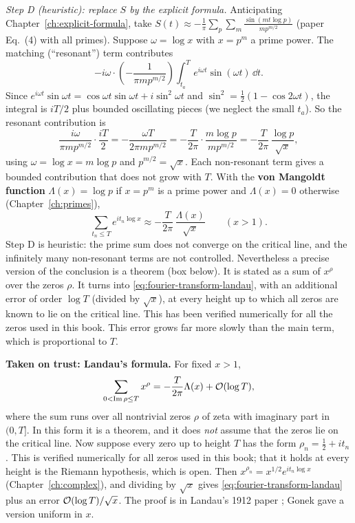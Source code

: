 \emph{Step D (heuristic): replace $S$ by the explicit formula.} Anticipating Chapter~\ref{ch:explicit-formula}, take $S(t)\approx-\frac1\pi\sum_{p}\sum_{m}\frac{\sin(mt\log p)}{mp^{m/2}}$ (paper Eq.~(4) with all primes). Suppose $\omega=\log x$ with $x=p^m$ a prime power. The matching (``resonant'') term contributes
\[-i\omega\cdot\left(-\frac{1}{\pi mp^{m/2}}\right)\int_{t_a}^{T}e^{i\omega t}\sin(\omega t)\,\dd t .\]
Since $e^{i\omega t}\sin\omega t=\cos\omega t\sin\omega t+i\sin^2\omega t$ and $\sin^2=\frac12(1-\cos2\omega t)$, the integral is $iT/2$ plus bounded oscillating pieces (we neglect the small $t_a$). So the resonant contribution is
\[\frac{i\omega}{\pi mp^{m/2}}\cdot\frac{iT}{2}=-\frac{\omega T}{2\pi mp^{m/2}}=-\frac{T}{2\pi}\cdot\frac{m\log p}{mp^{m/2}}=-\frac{T}{2\pi}\,\frac{\log p}{\sqrt x},\]
using $\omega=\log x=m\log p$ and $p^{m/2}=\sqrt x$. Each non-resonant term gives a bounded contribution that does not grow with $T$. With the \textbf{von Mangoldt function} $\Lambda(x)=\log p$ if $x=p^m$ is a prime power and $\Lambda(x)=0$ otherwise (Chapter~\ref{ch:primes}),
\begin{equation}
\sum_{t_n\le T}e^{i t_n\log x}\approx-\frac{T}{2\pi}\,\frac{\Lambda(x)}{\sqrt x}\qquad(x>1).
\label{eq:fourier-transform-landau}
\end{equation}
Step D is heuristic: the prime sum does not converge on the critical line, and the infinitely many non-resonant terms are not controlled. Nevertheless a precise version of the conclusion is a theorem (box below). It is stated as a sum of $x^\rho$ over the zeros $\rho$. It turns into \eqref{eq:fourier-transform-landau}, with an additional error of order $\log T$ (divided by $\sqrt x$), at every height up to which all zeros are known to lie on the critical line. This has been verified numerically for all the zeros used in this book. This error grows far more slowly than the main term, which is proportional to $T$.

\begin{beyond}
\textbf{Taken on trust: Landau's formula.} For fixed $x>1$,
\[\sum_{0<\operatorname{Im}\rho\le T}x^{\rho}=-\frac{T}{2\pi}\Lambda(x)+\mathcal{O}(\log T),\]
where the sum runs over all nontrivial zeros $\rho$ of zeta with imaginary part in $(0,T]$. In this form it is a theorem, and it does \emph{not} assume that the zeros lie on the critical line. Now suppose every zero up to height $T$ has the form $\rho_n=\frac12+it_n$. This is verified numerically for all zeros used in this book; that it holds at every height is the Riemann hypothesis, which is open. Then $x^{\rho_n}=x^{1/2}e^{it_n\log x}$ (Chapter~\ref{ch:complex}), and dividing by $\sqrt x$ gives \eqref{eq:fourier-transform-landau} plus an error $\mathcal{O}(\log T)/\sqrt x$. The proof is in Landau's 1912 paper \cite{landau}; Gonek \cite{gonek} gave a version uniform in $x$.
\end{beyond}


